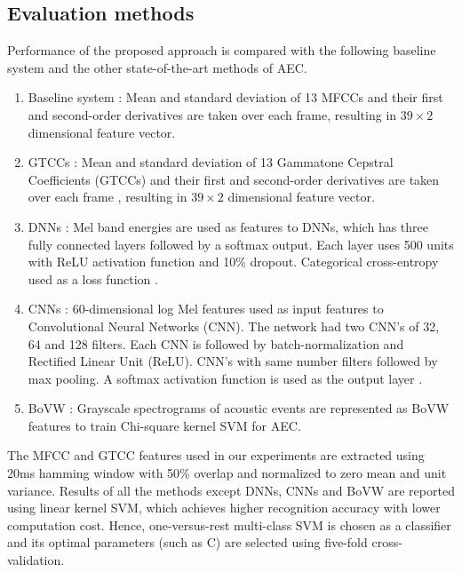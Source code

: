 \documentclass[a4paper]{article}
\begin{document}
\subsection{Evaluation methods}
Performance of the proposed approach is compared with the following baseline system and the other state-of-the-art methods of AEC.
\begin{enumerate}
	\item Baseline system : Mean and standard deviation of 13 MFCCs and their first and second-order derivatives are taken over each frame, resulting in $39\times2$ dimensional feature vector. 
	\item GTCCs : Mean and standard deviation of 13  Gammatone Cepstral Coefficients (GTCCs) and their first and second-order derivatives are taken over each frame \cite{valero2012gammatone}, resulting in $39\times2$ dimensional feature vector. 
	\item DNNs : Mel band energies are used as features to DNNs, which has three fully connected layers followed by a softmax output. Each layer uses 500 units with ReLU activation function and 10\% dropout. Categorical cross-entropy used as a loss function \cite{kong2016deep}. 
	\item CNNs : 60-dimensional log Mel features used as input features to 
	Convolutional Neural Networks (CNN).
	The network had two CNN's of 32, 64 and 128 filters. Each CNN is followed by batch-normalization and Rectified Linear Unit (ReLU). CNN's with same number filters followed by max pooling.   A softmax activation function is used as the output layer \cite{li2017comparison}.
	\item BoVW : Grayscale spectrograms of acoustic events are represented as BoVW \cite{mulimani2018robust} features to train Chi-square kernel SVM for AEC.
\end{enumerate}
The MFCC and GTCC features used in our experiments are extracted using 20ms hamming window with 50\% overlap and normalized to zero mean and unit variance. Results of all the methods except DNNs, CNNs and BoVW are reported using linear kernel SVM, which achieves higher recognition accuracy with lower computation cost. %
Hence, one-versus-rest multi-class SVM is chosen as a classifier and its  optimal parameters (such as C) are selected using five-fold cross-validation. 
\end{document}
